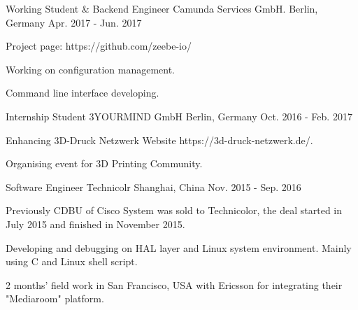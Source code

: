 

\begin{cventries}

  \cventry
    {Working Student \& Backend Engineer} %
    {Camunda Services GmbH.} %
    {Berlin, Germany} %
    {Apr. 2017 - Jun. 2017} %
    {
      \begin{cvitems} %
        \item {Project page: https://github.com/zeebe-io/}
        \item {Working on configuration management.}
        \item {Command line interface developing.}
      \end{cvitems}
    }

  \cventry
    {Internship Student} %
    {3YOURMIND GmbH} %
    {Berlin, Germany} %
    {Oct. 2016 - Feb. 2017} %
    {
      \begin{cvitems} %
        \item {Enhancing 3D-Druck Netzwerk Website https://3d-druck-netzwerk.de/.}
        \item {Organising event for 3D Printing Community.}
      \end{cvitems}
    }

  \cventry
    {Software Engineer} %
    {Technicolr} %
    {Shanghai, China} %
    {Nov. 2015 - Sep. 2016} %
    {
      \begin{cvitems} %
        \item {Previously CDBU of Cisco System was sold to Technicolor, the deal started in July 2015 and finished in November 2015.}
        \item {Developing and debugging on HAL layer and Linux system environment. Mainly using C and Linux shell script.}
        \item {2 months' field work in San Francisco, USA with Ericsson for integrating their "Mediaroom" platform.}
      \end{cvitems}
    }


\end{cventries}
